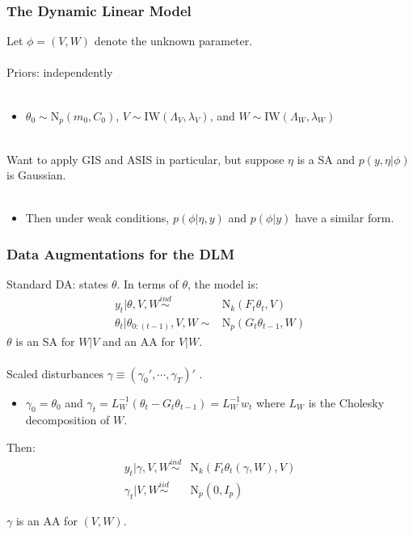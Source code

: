 \documentclass[xcolor=dvipsnames]{beamer}
\newcommand\N{\mathrm{N}}
\begin{document}
\begin{frame}
  \frametitle{The Dynamic Linear Model} 
Let $\phi=(V,W)$ denote the unknown parameter.\\~\\

Priors: independently \\~\\
\begin{itemize}
\item[]$\theta_0\sim \N_p(m_0,C_0)$, $V\sim \mathrm{IW}(\Lambda_V,\lambda_V)$, and $W\sim \mathrm{IW}(\Lambda_W,\lambda_W)$\\~\\
\end{itemize}

\pause Want to apply GIS and ASIS in particular, but suppose $\eta$ is a SA and $p(y,\eta|\phi)$ is Gaussian.\\~
\begin{itemize}
\item[] Then under weak conditions, $p(\phi|\eta,y)$ and $p(\phi|y)$ have a similar form.
\end{itemize}

\end{frame}

\begin{frame}
\frametitle{Data Augmentations for the DLM}
Standard DA: states $\theta$. In terms of $\theta$, the model is:
\begin{align*}
y_t|\theta,V,W \stackrel{ind}{\sim} & \N_k(F_t\theta_t,V)\\ 
\theta_t|\theta_{0:(t-1)},V,W \sim & \N_p(G_t\theta_{t-1},W)
\end{align*} 
{\color{blue}$\theta$ is an SA for $W|V$ and an AA for $V|W$.}\\~\\

\pause Scaled disturbances $\gamma\equiv(\gamma_0',\cdots,\gamma_T)'$ \citep{fruhwirth2004efficient}.
\begin{itemize}
\item[]$\gamma_0=\theta_0$ and $\gamma_t=L_W^{-1}(\theta_t - G_t\theta_{t-1})=L_W^{-1}w_t$ where $L_W$ is the Cholesky decomposition of $W$.
\end{itemize}
Then:
\begin{align*}
y_t|\gamma,V,W \stackrel{ind}{\sim} & \N_k(F_t\theta_t(\gamma,W),V) \\
\gamma_t|V,W \stackrel{iid}{\sim} & \N_p(0,I_p)
\end{align*} 

{\color{blue}$\gamma$ is an AA for $(V,W)$.}

\end{frame}
\end{document}
